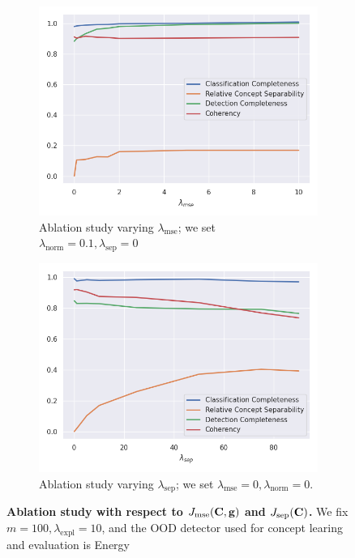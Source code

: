 \begin{figure}[hbt]
  \centering
  \begin{subfigure}{0.45\linewidth}
    \includegraphics[width=\textwidth]{figures/ablation_mse.png}
    \caption{Ablation study varying $\lambda_\textrm{mse}$; we set $\lambda_\textrm{norm} = 0.1, \lambda_\textrm{sep} = 0$}
    \label{fig:ablation_mse}
  \end{subfigure}
  \hfill
  \begin{subfigure}{0.45\linewidth}
    \includegraphics[width=\textwidth]{figures/ablation_sep.png}
    \caption{Ablation study varying $\lambda_\textrm{sep}$; we set $\lambda_\textrm{mse} = 0, \lambda_\textrm{norm} = 0$.}
    \label{fig:ablation_sep}
  \end{subfigure}
  \caption{\textbf{Ablation study with respect to $J_\textrm{mse}(\mathbf{C}, \mathbf{g})$ and $J_\textrm{sep}(\mathbf{C})$.} We fix $m = 100, \lambda_\textrm{expl} = 10$, and the OOD detector used for concept learing and evaluation is Energy \cite{liu2020energy}}
\label{fig:ablation}
\end{figure}

